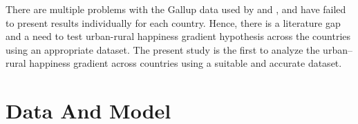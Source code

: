 \documentclass[11pt, letterpaper]{article}
\begin{document}

There are multiple problems with the Gallup data used by \citet{easterlin10al}
and \citet{burger20}, and \citet{aok11a} have failed to present results
individually for each country. 
 Hence, there is a literature gap and a need to test urban-rural happiness
 gradient hypothesis across the countries using an appropriate dataset. The present study is the first to analyze the urban--rural happiness gradient across countries using a suitable and accurate dataset. 

\section*{Data And Model}
\end{document}
